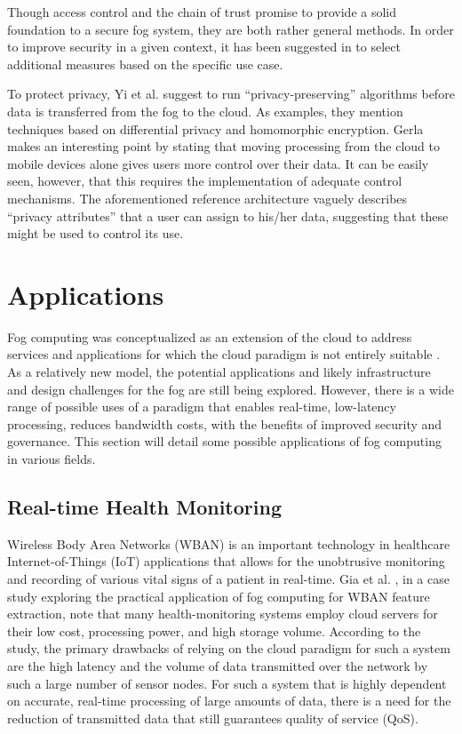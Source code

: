 \documentclass{article}
\begin{document}
Though access control and the chain of trust promise to provide a solid foundation to a secure fog system, they are both rather general methods. In order to improve security in a given context, it has been suggested in \cite{openfogconsortium2017} to select additional measures based on the specific use case.

To protect privacy, Yi et al. \cite{yi2015survey} suggest to run ``privacy-preserving'' algorithms before data is transferred from the fog to the cloud. As examples, they mention techniques based on differential privacy and homomorphic encryption. Gerla \cite{gerla2012vehicular} makes an interesting point by stating that moving processing from the cloud to mobile devices alone gives users more control over their data. It can be easily seen, however, that this requires the implementation of adequate control mechanisms. The aforementioned reference architecture \cite{openfogconsortium2017} vaguely describes ``privacy attributes'' that a user can assign to his/her data, suggesting that these might be used to control its use.

\pagebreak

\section{Applications}

Fog computing was conceptualized as an extension of the cloud to address services and applications for which the cloud paradigm is not entirely suitable \cite{bessis2014big}. As a relatively new model, the potential applications and likely infrastructure and design challenges for the fog are still being explored. However, there is a wide range of possible uses of a paradigm that enables real-time, low-latency processing, reduces bandwidth costs, with the benefits of improved security and governance. This section will detail some possible applications of fog computing in various fields.

\subsection{Real-time Health Monitoring}
Wireless Body Area Networks (WBAN) is an important technology in healthcare Internet-of-Things (IoT) applications that allows for the unobtrusive monitoring and recording of various vital signs of a patient in real-time. Gia et al. \cite{gia2015fog}, in a case study exploring the practical application of fog computing for WBAN feature extraction, note that many health-monitoring systems employ cloud servers for their low cost, processing power, and high storage volume. According to the study, the primary drawbacks of relying on the cloud paradigm for such a system are the high latency and the volume of data transmitted over the network by such a large number of sensor nodes. For such a system that is highly dependent on accurate, real-time processing of large amounts of data, there is a need for the reduction of transmitted data that still guarantees quality of service (QoS).
\end{document}
